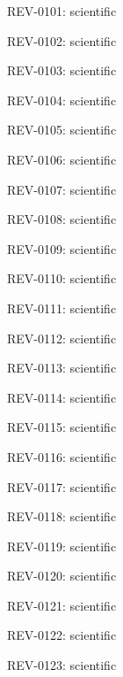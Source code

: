 \documentclass[10pt,openany]{book}
\begin{document}
\noindent REV-0101:  scientific\par

\noindent REV-0102:  scientific\par

\noindent REV-0103:  scientific\par

\noindent REV-0104:  scientific\par

\noindent REV-0105:  scientific\par

\noindent REV-0106:  scientific\par

\noindent REV-0107:  scientific\par

\noindent REV-0108:  scientific\par

\noindent REV-0109:  scientific\par

\noindent REV-0110:  scientific\par

\noindent REV-0111:  scientific\par

\noindent REV-0112:  scientific\par

\noindent REV-0113:  scientific\par

\noindent REV-0114:  scientific\par

\noindent REV-0115:  scientific\par

\noindent REV-0116:  scientific\par

\noindent REV-0117:  scientific\par

\noindent REV-0118:  scientific\par

\noindent REV-0119:  scientific\par

\noindent REV-0120:  scientific\par

\noindent REV-0121:  scientific\par

\noindent REV-0122:  scientific\par

\noindent REV-0123:  scientific\par
\end{document}
